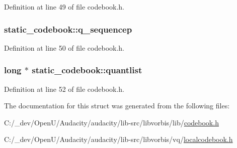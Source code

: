 Definition at line 49 of file codebook.\+h.

\subsubsection[{\texorpdfstring{q\+\_\+sequencep}{q_sequencep}}]{ static\+\_\+codebook\+::q\+\_\+sequencep}\hypertarget{structstatic__codebook_aae1321f5435c0b33f22beb66636aa3b2}{}\label{structstatic__codebook_aae1321f5435c0b33f22beb66636aa3b2}


Definition at line 50 of file codebook.\+h.

\subsubsection[{\texorpdfstring{quantlist}{quantlist}}]{\setlength{\rightskip}{0pt plus 5cm}long $\ast$ static\+\_\+codebook\+::quantlist}\hypertarget{structstatic__codebook_ae21b02047f7e9fb30a72ad1c41c92426}{}\label{structstatic__codebook_ae21b02047f7e9fb30a72ad1c41c92426}


Definition at line 52 of file codebook.\+h.



The documentation for this struct was generated from the following files\+:\begin{DoxyCompactItemize}
\item 
C\+:/\+\_\+dev/\+Open\+U/\+Audacity/audacity/lib-\/src/libvorbis/lib/\hyperlink{codebook_8h}{codebook.\+h}\item 
C\+:/\+\_\+dev/\+Open\+U/\+Audacity/audacity/lib-\/src/libvorbis/vq/\hyperlink{localcodebook_8h}{localcodebook.\+h}\end{DoxyCompactItemize}
